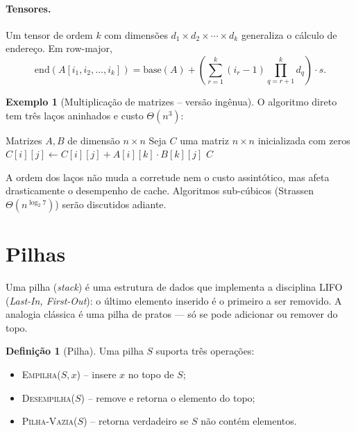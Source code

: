 \documentclass[9pt,a4paper]{extarticle}
\newcommand{\impt}[1]{\textcolor{important}{#1}}
\theoremstyle{definition}
\newtheorem{definition}{Definição}[section]
\newtheorem{example}{Exemplo}[section]
\begin{document}
\paragraph{Tensores.} Um tensor de ordem $k$ com dimensões $d_1 \times d_2 \times \cdots \times d_k$ generaliza o cálculo de endereço. Em row-major,
\[
\mathrm{end}(A[i_1, i_2, \ldots, i_k]) = \mathrm{base}(A) + \left( \sum_{r=1}^{k} (i_r - 1) \prod_{q=r+1}^{k} d_q \right) \cdot s.
\]

\begin{example}[Multiplicação de matrizes -- versão ingênua]
O algoritmo direto tem três laços aninhados e custo $\Theta(n^3)$:
\begin{algorithm}[H]
\caption{\textsc{Mult-Mat}($A, B, n$)}
\begin{algorithmic}[1]
\Require Matrizes $A, B$ de dimensão $n \times n$
\State Seja $C$ uma matriz $n \times n$ inicializada com zeros
            \State $C[i][j] \gets C[i][j] + A[i][k] \cdot B[k][j]$
        \EndFor
    \EndFor
\EndFor
\State \Return $C$
\end{algorithmic}
\end{algorithm}
A ordem dos laços não muda a corretude nem o custo assintótico, mas afeta drasticamente o desempenho de cache. Algoritmos sub-cúbicos (Strassen $\Theta(n^{\log_2 7})$) serão discutidos adiante.
\end{example}

\section{Pilhas}

Uma \impt{pilha} (\emph{stack}) é uma estrutura de dados que implementa a disciplina \impt{LIFO} (\emph{Last-In, First-Out}): o último elemento inserido é o primeiro a ser removido. A analogia clássica é uma pilha de pratos — só se pode adicionar ou remover do topo.

\begin{definition}[Pilha]
Uma pilha $S$ suporta três operações:
\begin{itemize}
    \item \textsc{Empilha}($S, x$) -- insere $x$ no topo de $S$;
    \item \textsc{Desempilha}($S$) -- remove e retorna o elemento do topo;
    \item \textsc{Pilha-Vazia}($S$) -- retorna verdadeiro se $S$ não contém elementos.
\end{itemize}
\end{definition}
\end{document}
